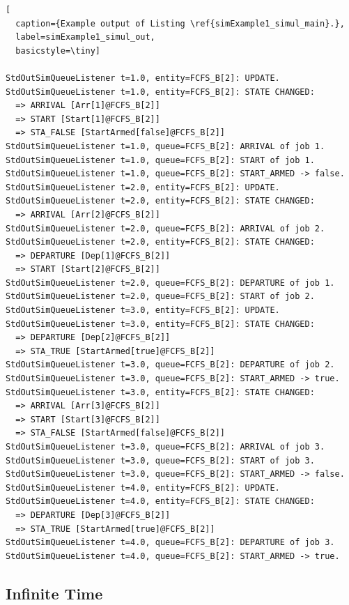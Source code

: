 \documentclass[12pt]{book}
\begin{document}
\begin{lstfloat}
\begin{lstlisting}[
  caption={Example output of Listing \ref{simExample1_simul_main}.},
  label=simExample1_simul_out,
  basicstyle=\tiny]

StdOutSimQueueListener t=1.0, entity=FCFS_B[2]: UPDATE.
StdOutSimQueueListener t=1.0, entity=FCFS_B[2]: STATE CHANGED:
  => ARRIVAL [Arr[1]@FCFS_B[2]]
  => START [Start[1]@FCFS_B[2]]
  => STA_FALSE [StartArmed[false]@FCFS_B[2]]
StdOutSimQueueListener t=1.0, queue=FCFS_B[2]: ARRIVAL of job 1.
StdOutSimQueueListener t=1.0, queue=FCFS_B[2]: START of job 1.
StdOutSimQueueListener t=1.0, queue=FCFS_B[2]: START_ARMED -> false.
StdOutSimQueueListener t=2.0, entity=FCFS_B[2]: UPDATE.
StdOutSimQueueListener t=2.0, entity=FCFS_B[2]: STATE CHANGED:
  => ARRIVAL [Arr[2]@FCFS_B[2]]
StdOutSimQueueListener t=2.0, queue=FCFS_B[2]: ARRIVAL of job 2.
StdOutSimQueueListener t=2.0, entity=FCFS_B[2]: STATE CHANGED:
  => DEPARTURE [Dep[1]@FCFS_B[2]]
  => START [Start[2]@FCFS_B[2]]
StdOutSimQueueListener t=2.0, queue=FCFS_B[2]: DEPARTURE of job 1.
StdOutSimQueueListener t=2.0, queue=FCFS_B[2]: START of job 2.
StdOutSimQueueListener t=3.0, entity=FCFS_B[2]: UPDATE.
StdOutSimQueueListener t=3.0, entity=FCFS_B[2]: STATE CHANGED:
  => DEPARTURE [Dep[2]@FCFS_B[2]]
  => STA_TRUE [StartArmed[true]@FCFS_B[2]]
StdOutSimQueueListener t=3.0, queue=FCFS_B[2]: DEPARTURE of job 2.
StdOutSimQueueListener t=3.0, queue=FCFS_B[2]: START_ARMED -> true.
StdOutSimQueueListener t=3.0, entity=FCFS_B[2]: STATE CHANGED:
  => ARRIVAL [Arr[3]@FCFS_B[2]]
  => START [Start[3]@FCFS_B[2]]
  => STA_FALSE [StartArmed[false]@FCFS_B[2]]
StdOutSimQueueListener t=3.0, queue=FCFS_B[2]: ARRIVAL of job 3.
StdOutSimQueueListener t=3.0, queue=FCFS_B[2]: START of job 3.
StdOutSimQueueListener t=3.0, queue=FCFS_B[2]: START_ARMED -> false.
StdOutSimQueueListener t=4.0, entity=FCFS_B[2]: UPDATE.
StdOutSimQueueListener t=4.0, entity=FCFS_B[2]: STATE CHANGED:
  => DEPARTURE [Dep[3]@FCFS_B[2]]
  => STA_TRUE [StartArmed[true]@FCFS_B[2]]
StdOutSimQueueListener t=4.0, queue=FCFS_B[2]: DEPARTURE of job 3.
StdOutSimQueueListener t=4.0, queue=FCFS_B[2]: START_ARMED -> true.

\end{lstlisting}
\end{lstfloat}

\subsection{Infinite Time}
\label{sec:infinite-time}
\end{document}
